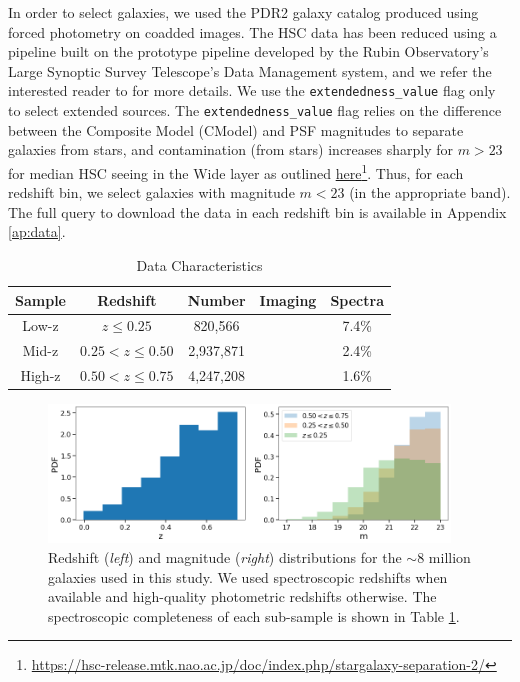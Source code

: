 In order to select galaxies, we used the PDR2 galaxy catalog produced using forced photometry on coadded images. The HSC data has been reduced using a pipeline built on the prototype pipeline developed by the Rubin Observatory's Large Synoptic Survey Telescope's Data Management system, and we refer the interested reader to \citet{hsc_pipeline} for more details. We use the \texttt{extendedness\_value} flag only to select extended sources. The \texttt{extendedness\_value} flag relies on the difference between the Composite Model (CModel) and PSF magnitudes to separate galaxies from stars, and contamination (from stars) increases sharply for $m > 23$ for median HSC seeing in the Wide layer as outlined \href{https://hsc-release.mtk.nao.ac.jp/doc/index.php/stargalaxy-separation-2/}{here}\footnote{\href{https://hsc-release.mtk.nao.ac.jp/doc/index.php/stargalaxy-separation-2/}{https://hsc-release.mtk.nao.ac.jp/doc/index.php/stargalaxy-separation-2/}}. Thus, for each redshift bin, we  select galaxies with magnitude $m < 23$ (in the appropriate band). The full query to download the data in each redshift bin is available in Appendix \ref{ap:data}.

\begin{table}[htbp]
\centering
\caption{Data Characteristics  \label{tab_c3:data}}
\begin{tabular}{ccccc}
\hline
\hline
Sample & Redshift & Number & Imaging & Spectra \\
\hline
    \hline
    Low-z & $z\leq0.25$ & 820,566 & \gb{} & 7.4\% \\
    Mid-z & $0.25 < z\leq0.50$ & 2,937,871 & \rb{} & 2.4\% \\
    High-z & $0.50 < z\leq0.75$ & 4,247,208 & \ib{} & 1.6\% \\
\hline
\end{tabular}
\end{table}

\begin{figure}[htb]
    \centering
    \includegraphics[width = 0.95\textwidth]{z_mag_distr_old.png}
    \caption{Redshift ({\it left}) and magnitude ({\it right}) distributions for the $\sim8$ million galaxies used in this study.
    We used spectroscopic redshifts when available and high-quality photometric redshifts otherwise. The spectroscopic completeness
    of each sub-sample is shown in Table \ref{tab_c3:data}.}
    \label{fig_c3:z_mag_distr}
\end{figure}

